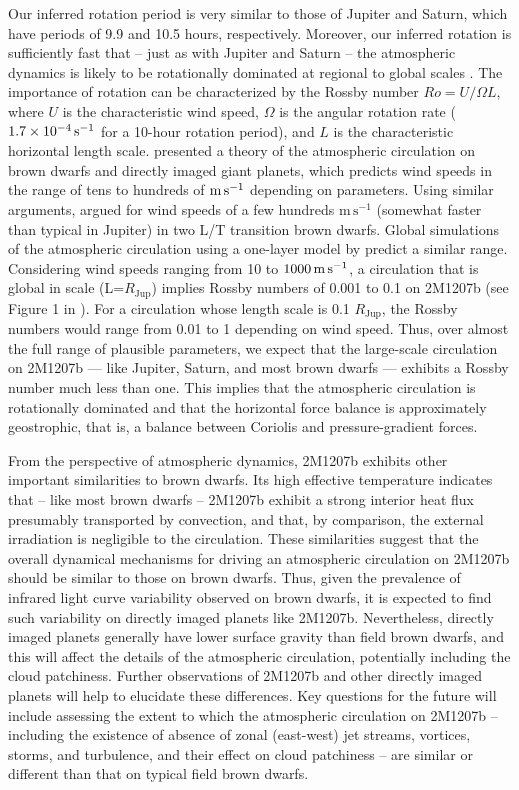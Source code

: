 \documentclass[apj]{emulateapj}
\begin{document}
Our inferred rotation period is very similar to those of Jupiter and
Saturn, which have periods of 9.9 and 10.5 hours, respectively.
Moreover, our inferred rotation is sufficiently fast that -- just as
with Jupiter and Saturn -- the atmospheric dynamics is likely to be
rotationally dominated at regional to global scales
\citep[][]{Showman2013}.  The importance of rotation can be
characterized by the Rossby number $Ro = U/\Omega L$, where $U$ is the
characteristic wind speed, $\Omega$ is the angular rotation rate
($1.7\times10^{-4}\rm\,s^{-1}$ for a 10-hour rotation period), and $L$
is the characteristic horizontal length scale.
\citet[][]{Showman2013} presented a theory of the
atmospheric circulation on brown dwarfs and directly imaged giant
planets, which predicts wind speeds in the range of tens to hundreds
of $\rm m\,s^{-1}$ depending on parameters. Using similar arguments,
\citet[][]{Apai2013}  argued for wind speeds of a few hundreds $\mathrm{m\,s^{-1}}$
(somewhat faster than typical in Jupiter) in two L/T transition brown
dwarfs.
Global simulations of the
atmospheric circulation using a one-layer model by \citet{Zhang2014}
predict a similar range.  Considering wind speeds ranging from 10 to
$1000\rm\,m\,s^{-1}$, a circulation that is global in scale
(L=$R_{\mathrm{Jup}}$) implies Rossby numbers of 0.001 to 0.1 on
2M1207b (see Figure 1 in \citet{Showman2013}).  For a circulation
whose length scale is 0.1 $R_{\mathrm{Jup}}$, the Rossby numbers would
range from 0.01 to 1 depending on wind speed.  Thus, over almost the
full range of plausible parameters, we expect that the large-scale
circulation on 2M1207b --- like Jupiter, Saturn, and most brown
dwarfs --- exhibits a Rossby number much less than one.  This implies
that the atmospheric circulation is rotationally dominated and that
the horizontal force balance is approximately geostrophic, that is, a
balance between Coriolis and pressure-gradient forces.

From the perspective of atmospheric dynamics, 2M1207b exhibits other
important similarities to brown dwarfs.  Its high effective
temperature indicates that -- like most brown dwarfs -- 2M1207b exhibit a
strong interior heat flux presumably transported by convection, and
that, by comparison, the external irradiation is negligible to the
circulation.  These similarities suggest that the overall dynamical
mechanisms for driving an atmospheric circulation on 2M1207b should be
similar to those on brown dwarfs.  Thus, given the prevalence of
infrared light curve variability observed on brown dwarfs, it is expected
to find such variability on directly imaged planets like 2M1207b.
Nevertheless, directly imaged planets generally have lower surface gravity
than field brown dwarfs, and this will affect the details of the
atmospheric circulation, potentially including the cloud patchiness.
Further observations of 2M1207b and other directly imaged planets will
help to elucidate these differences.  Key questions for the future
will include assessing the extent to which the atmospheric circulation
on 2M1207b -- including the existence of absence of zonal (east-west)
jet streams, vortices, storms, and turbulence, and their effect on
cloud patchiness -- are similar or different than that on typical field
brown dwarfs.
\end{document}
